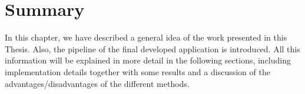 \section{Summary}\label{ch:chapter00_03}

In this chapter, we have described a general idea of the work presented in this Thesis. Also, the pipeline of the final developed application is introduced. All this information will be explained in more detail in the following sections, including implementation details together with some results and a discussion of the advantages/disadvantages of the different methods.


